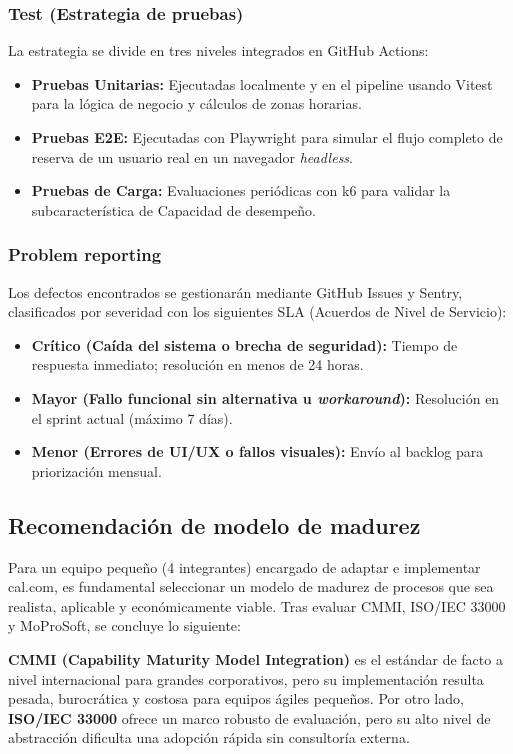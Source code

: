 \documentclass[12pt, a4paper]{article}
\begin{document}
\subsubsection*{Test (Estrategia de pruebas)}
La estrategia se divide en tres niveles integrados en GitHub Actions:
\begin{itemize}
    \item \textbf{Pruebas Unitarias:} Ejecutadas localmente y en el pipeline usando Vitest para la lógica de negocio y cálculos de zonas horarias.
    \item \textbf{Pruebas E2E:} Ejecutadas con Playwright para simular el flujo completo de reserva de un usuario real en un navegador \textit{headless}.
    \item \textbf{Pruebas de Carga:} Evaluaciones periódicas con k6 para validar la subcaracterística de Capacidad de desempeño.
\end{itemize}

\subsubsection*{Problem reporting}
Los defectos encontrados se gestionarán mediante GitHub Issues y Sentry, clasificados por severidad con los siguientes SLA (Acuerdos de Nivel de Servicio):
\begin{itemize}
    \item \textbf{Crítico (Caída del sistema o brecha de seguridad):} Tiempo de respuesta inmediato; resolución en menos de 24 horas.
    \item \textbf{Mayor (Fallo funcional sin alternativa u \textit{workaround}):} Resolución en el sprint actual (máximo 7 días).
    \item \textbf{Menor (Errores de UI/UX o fallos visuales):} Envío al backlog para priorización mensual.
\end{itemize}

\subsection{Recomendación de modelo de madurez}
Para un equipo pequeño (4 integrantes) encargado de adaptar e implementar cal.com, es fundamental seleccionar un modelo de madurez de procesos que sea realista, aplicable y económicamente viable. Tras evaluar CMMI, ISO/IEC 33000 y MoProSoft, se concluye lo siguiente:

\textbf{CMMI (Capability Maturity Model Integration)} es el estándar de facto a nivel internacional para grandes corporativos, pero su implementación resulta pesada, burocrática y costosa para equipos ágiles pequeños. Por otro lado, \textbf{ISO/IEC 33000} ofrece un marco robusto de evaluación, pero su alto nivel de abstracción dificulta una adopción rápida sin consultoría externa.
\end{document}
